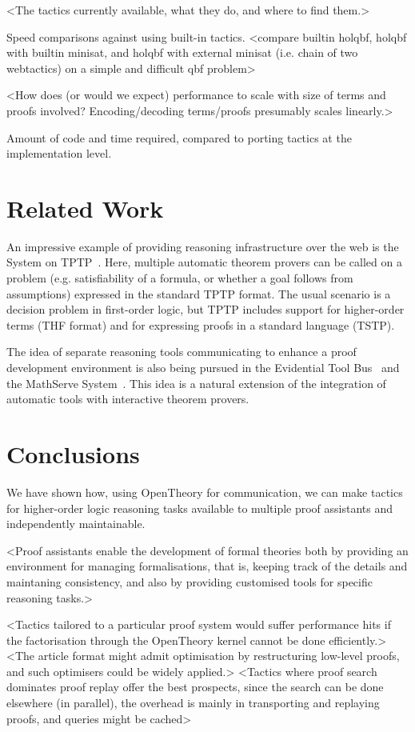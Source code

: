 \documentclass{llncs}
\newcommand{\OpenTheory}{OpenTheory\xspace}
\newcommand{\eg}{e.g.\xspace}
\begin{document}
<The tactics currently available, what they do, and where to find them.>

Speed comparisons against using built-in tactics.
<compare builtin holqbf, holqbf with builtin minisat, and holqbf with external minisat (i.e. chain of two webtactics) on a simple and difficult qbf problem>

<How does (or would we expect) performance to scale with size of terms and proofs involved? Encoding/decoding terms/proofs presumably scales linearly.>

Amount of code and time required, compared to porting tactics at the implementation level.

\section{Related Work}

An impressive example of providing reasoning infrastructure over the web is the System on TPTP~\cite{DBLP:conf/lpar/Sutcliffe10}.
Here, multiple automatic theorem provers can be called on a problem (\eg satisfiability of a formula, or whether a goal follows from assumptions) expressed in the standard TPTP format.
The usual scenario is a decision problem in first-order logic, but TPTP includes support for higher-order terms (THF format) and for expressing proofs in a standard language (TSTP).

The idea of separate reasoning tools communicating to enhance a proof development environment is also being pursued in the Evidential Tool Bus~\cite{DBLP:conf/icfem/Rushby05,fk:etb} and the MathServe System~\cite{DBLP:conf/cade/ZimmerA06}.
This idea is a natural extension of the integration of automatic tools with interactive theorem provers.

\section{Conclusions}

We have shown how, using \OpenTheory for communication, we can make tactics for higher-order logic reasoning tasks available to multiple proof assistants and independently maintainable.

<Proof assistants enable the development of formal theories both by providing an environment for managing formalisations, that is, keeping track of the details and maintaning consistency, and also by providing customised tools for specific reasoning tasks.>

<Tactics tailored to a particular proof system would suffer performance hits if the factorisation through the OpenTheory kernel cannot be done efficiently.>
<The article format might admit optimisation by restructuring low-level proofs, and such optimisers could be widely applied.>
<Tactics where proof search dominates proof replay offer the best prospects, since the search can be done elsewhere (in parallel), the overhead is mainly in transporting and replaying proofs, and queries might be cached>
\end{document}
